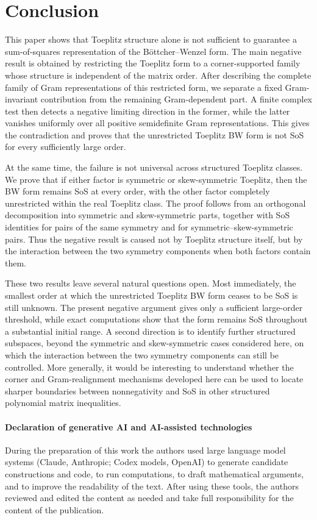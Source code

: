 \section{Conclusion}\label{sec:conclusion}

This paper shows that Toeplitz structure alone is not sufficient to
guarantee a sum-of-squares representation of the
B\"ottcher--Wenzel form.  The main negative result is obtained by
restricting the Toeplitz form to a corner-supported family whose
structure is independent of the matrix order.  After describing the
complete family of Gram representations of this restricted form, we
separate a fixed Gram-invariant contribution from the remaining
Gram-dependent part.  A finite complex test then detects a negative
limiting direction in the former, while the latter vanishes uniformly
over all positive semidefinite Gram representations.  This gives the
contradiction and proves that the unrestricted Toeplitz BW form is not
SoS for every sufficiently large order.

At the same time, the failure is not universal across structured
Toeplitz classes.  We prove that if either factor is symmetric or
skew-symmetric Toeplitz, then the BW form remains SoS at every order,
with the other factor completely unrestricted within the real Toeplitz
class.  The proof follows from an orthogonal decomposition into
symmetric and skew-symmetric parts, together with SoS identities for
pairs of the same symmetry and for symmetric--skew-symmetric pairs.
Thus the negative result is caused not by Toeplitz structure itself,
but by the interaction between the two symmetry components when both
factors contain them.

These two results leave several natural questions open.  Most
immediately, the smallest order at which the unrestricted Toeplitz BW
form ceases to be SoS is still unknown.  The present negative argument
gives only a sufficient large-order threshold, while exact computations
show that the form remains SoS throughout a substantial initial range.
A second direction is to identify further structured subspaces, beyond
the symmetric and skew-symmetric cases considered here, on which the
interaction between the two symmetry components can still be controlled.
More generally, it would be interesting to understand whether the
corner and Gram-realignment mechanisms developed here can be used to
locate sharper boundaries between nonnegativity and SoS in other
structured polynomial matrix inequalities.

\paragraph{Declaration of generative AI and AI-assisted technologies}
During the preparation of this work the authors used large language model
systems (Claude, Anthropic; Codex models, OpenAI) to generate candidate
constructions and code, to run computations, to draft mathematical
arguments, and to improve the readability of the text. After using these
tools, the authors reviewed and edited the content as needed and take full
responsibility for the content of the publication.

